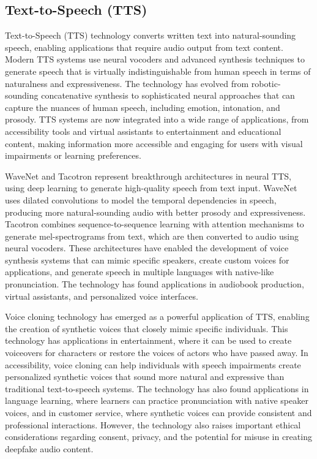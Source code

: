 \subsection{Text-to-Speech (TTS)}

Text-to-Speech (TTS) technology converts written text into natural-sounding speech, enabling applications that require audio output from text content. Modern TTS systems use neural vocoders and advanced synthesis techniques to generate speech that is virtually indistinguishable from human speech in terms of naturalness and expressiveness. The technology has evolved from robotic-sounding concatenative synthesis to sophisticated neural approaches that can capture the nuances of human speech, including emotion, intonation, and prosody. TTS systems are now integrated into a wide range of applications, from accessibility tools and virtual assistants to entertainment and educational content, making information more accessible and engaging for users with visual impairments or learning preferences.

WaveNet and Tacotron represent breakthrough architectures in neural TTS, using deep learning to generate high-quality speech from text input. WaveNet uses dilated convolutions to model the temporal dependencies in speech, producing more natural-sounding audio with better prosody and expressiveness. Tacotron combines sequence-to-sequence learning with attention mechanisms to generate mel-spectrograms from text, which are then converted to audio using neural vocoders. These architectures have enabled the development of voice synthesis systems that can mimic specific speakers, create custom voices for applications, and generate speech in multiple languages with native-like pronunciation. The technology has found applications in audiobook production, virtual assistants, and personalized voice interfaces.

Voice cloning technology has emerged as a powerful application of TTS, enabling the creation of synthetic voices that closely mimic specific individuals. This technology has applications in entertainment, where it can be used to create voiceovers for characters or restore the voices of actors who have passed away. In accessibility, voice cloning can help individuals with speech impairments create personalized synthetic voices that sound more natural and expressive than traditional text-to-speech systems. The technology has also found applications in language learning, where learners can practice pronunciation with native speaker voices, and in customer service, where synthetic voices can provide consistent and professional interactions. However, the technology also raises important ethical considerations regarding consent, privacy, and the potential for misuse in creating deepfake audio content.

